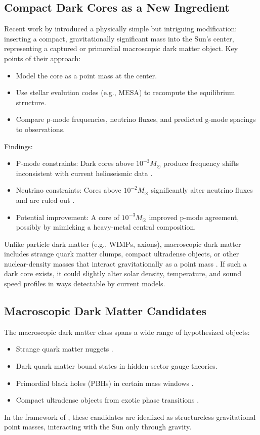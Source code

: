 \documentclass{article}
\begin{document}
\subsection{Compact Dark Cores as a New Ingredient}

Recent work by \citet{bellinger2025} introduced a physically simple but intriguing modification: inserting a compact, gravitationally significant mass into the Sun’s center, representing a captured or primordial macroscopic dark matter object. Key points of their approach:
\begin{itemize}
\item Model the core as a point mass at the center.
\item Use stellar evolution codes (e.g., MESA) to recompute the equilibrium structure.
\item Compare p-mode frequencies, neutrino fluxes, and predicted g-mode spacings to observations.
\end{itemize}
Findings:
\begin{itemize}
\item P-mode constraints: Dark cores above $10^{-3} M_\odot$ produce frequency shifts inconsistent with current helioseismic data \citep{aerts2010, lund2017}.
\item Neutrino constraints: Cores above $10^{-2} M_\odot$ significantly alter neutrino fluxes and are ruled out \citep{ahmad2002}.
\item Potential improvement: A core of $10^{-3} M_\odot$ improved p-mode agreement, possibly by mimicking a heavy-metal central composition.
\end{itemize}
Unlike particle dark matter (e.g., WIMPs, axions), macroscopic dark matter includes strange quark matter clumps, compact ultradense objects, or other nuclear-density masses that interact gravitationally as a point mass \citep{witten1984, bellinger2025, clemente2025}. If such a dark core exists, it could slightly alter solar density, temperature, and sound speed profiles in ways detectable by current models.

\subsection{Macroscopic Dark Matter Candidates}

The macroscopic dark matter class spans a wide range of hypothesized objects:
\begin{itemize}
\item Strange quark matter nuggets \citep{witten1984}.
\item Dark quark matter bound states in hidden-sector gauge theories.
\item Primordial black holes (PBHs) in certain mass windows \citep{hawking1971}.
\item Compact ultradense objects from exotic phase transitions \citep{farag2024}.
\end{itemize}
In the framework of \citet{bellinger2025}, these candidates are idealized as structureless gravitational point masses, interacting with the Sun only through gravity.
\end{document}
